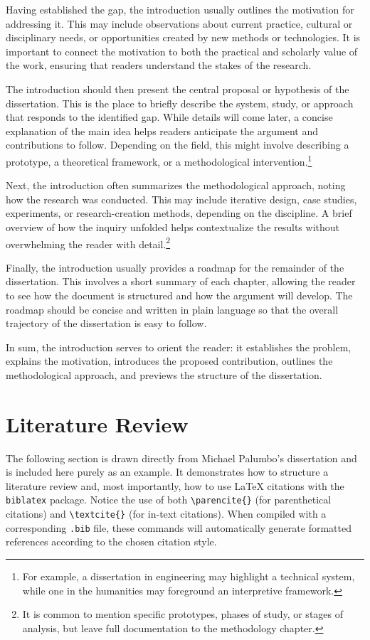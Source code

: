 \documentclass[12pt]{yorkudiss}
\begin{document}
Having established the gap, the introduction usually outlines the motivation for addressing it. This may include observations about current practice, cultural or disciplinary needs, or opportunities created by new methods or technologies. It is important to connect the motivation to both the practical and scholarly value of the work, ensuring that readers understand the stakes of the research.

The introduction should then present the central proposal or hypothesis of the dissertation. This is the place to briefly describe the system, study, or approach that responds to the identified gap. While details will come later, a concise explanation of the main idea helps readers anticipate the argument and contributions to follow. Depending on the field, this might involve describing a prototype, a theoretical framework, or a methodological intervention.\footnote{For example, a dissertation in engineering may highlight a technical system, while one in the humanities may foreground an interpretive framework.}

Next, the introduction often summarizes the methodological approach, noting how the research was conducted. This may include iterative design, case studies, experiments, or research-creation methods, depending on the discipline. A brief overview of how the inquiry unfolded helps contextualize the results without overwhelming the reader with detail.\footnote{It is common to mention specific prototypes, phases of study, or stages of analysis, but leave full documentation to the methodology chapter.}

Finally, the introduction usually provides a roadmap for the remainder of the dissertation. This involves a short summary of each chapter, allowing the reader to see how the document is structured and how the argument will develop. The roadmap should be concise and written in plain language so that the overall trajectory of the dissertation is easy to follow.

In sum, the introduction serves to orient the reader: it establishes the problem, explains the motivation, introduces the proposed contribution, outlines the methodological approach, and previews the structure of the dissertation.



\chapter{Literature Review}

The following section is drawn directly from Michael Palumbo’s dissertation and is included here purely as an example. It demonstrates how to structure a literature review and, most importantly, how to use LaTeX citations with the \texttt{biblatex} package. Notice the use of both \verb|\parencite{}| (for parenthetical citations) and \verb|\textcite{}| (for in-text citations). When compiled with a corresponding \texttt{.bib} file, these commands will automatically generate formatted references according to the chosen citation style.
\end{document}
